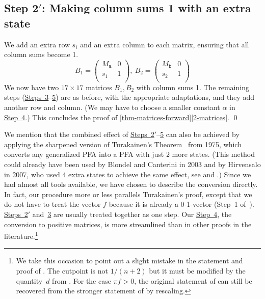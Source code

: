 \documentclass[a4paper,cleveref, autoref, thm-restate]{lipics-v2021}
\begin{document}
\subsection{Step 2\texorpdfstring{$'$}{'}: Making column sums 1 with
  an extra state}
\label{sec:step2'}
We add an extra row $s_i$
and an extra column to each matrix, ensuring that all
column sums become 1.
\begin{equation}
  B_1=%
  \begin{pmatrix}
    M_{\mathtt{a}} & 0\\
    s_1%
    & 1\\
  \end{pmatrix},
  \
  B_{2} =
  \begin{pmatrix}
    M_{\mathtt{b}} & 0\\
    s_2%
    & 1\\
  \end{pmatrix}
\end{equation}
We now have two $17\times 17$ matrices $B_1,B_2$ with column sums
1. %
The remaining steps (\hyperref[sec:step3]{Steps~3}--\hyperref[sec:step5]5) are as before, with the appropriate
adaptations, and they add another row and column. (We may have to choose a smaller constant $\alpha$ in
\hyperref[sec:step4]{Step~4}.)
This concludes the
proof of \autoref{thm-matrices-forward}\ref{2-matrices}. \qed

We mention that the combined effect of
\hyperref[sec:step2']{Steps~2$'$}--\hyperref[sec:step5]5 can also be achieved by applying
the sharpened version of Turakainen's 
Theorem~\cite[Theorem~1(i)] {Turakainen_1975} from 1975,
which converts any generalized PFA into a %
PFA with just 2 more states.
(This method could already have been used by
Blondel and Canterini
in 2003 and by Hirvensalo in 2007, who used 4 extra states to achieve the same effect, see
  \cite[Steps 3 and~4]{blondel-canterini-03}
and  
\cite[Steps 4 and~5]{hirvensalo07}.) %
Since we had almost all tools available, we have chosen to
describe the conversion directly.
In fact, our procedure more or less parallels Turakainen's proof,
except that we do not have to treat the vector $f$ because it is
already a 0-1-vector
(Step~1 of~\cite{Turakainen_1975}).
\hyperref[sec:step2']{Steps~2$'$} and~\hyperref[sec:step3]3 are usually treated together as one step.
Our \hyperref[sec:step4]{Step~4}, the conversion to positive matrices, is
 more streamlined than in other proofs in the
literature.\footnote{We take this occasion to point
  out a slight mistake in the statement and proof of 
\cite[Theorem~1(i)]{Turakainen_1975}.
The cutpoint is not $1/(n+2)$ but it must be modified by
the quantity~$d$ from 
\cite[top of p.~30]{Turakainen_1975}.
For the case $\pi f>0$, the original statement
of \cite[Theorem~1(i)]{Turakainen_1975}
can still be recovered from
the stronger statement of
\cite[Theorem~1(iv)]{Turakainen_1975} by rescaling.}
\end{document}
